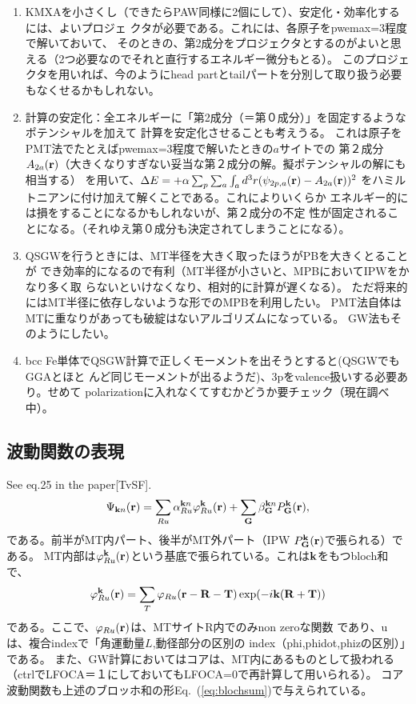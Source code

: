 \documentclass[a4paper,10pt,aip,onecolumn,amsmath,amssymb,floatfix,rmp]{revtex4-1}
\newcommand{\bfk}{{\bf k}}
\newcommand{\bfr}{{\bf r}}
\newcommand{\bfT}{{\bf T}}
\newcommand{\bfR}{{\bf R}}
\def\Psikn{\Psi_{{\bf k}n}}
\newcommand{\req}[1]{\mbox{Eq.~\!(\ref{#1})}}
\def\Psikn{{\Psi_{{\bf k}n}}}
\begin{document}
\begin{enumerate}
\item
KMXAを小さくし（できたらPAW同様に2個にして）、安定化・効率化するには、よいプロジェ
クタが必要である。これには、各原子をpwemax=3程度で解いておいて、
そのときの、第2成分をプロジェクタとするのがよいと思える（2つ必要なのでそれと直行するエネルギー微分もとる）。
このプロジェクタを用いれば、今のようにhead partとtailパートを分別して取り扱う必要もなくせるかもしれない。

\item
計算の安定化：全エネルギーに「第2成分（＝第０成分）」を固定するようなポテンシャルを加えて
計算を安定化させることも考えうる。
これは原子をPMT法でたとえばpwemax=3程度で解いたときの$a$サイトでの
第２成分$A_{2a}(\bfr)$（大きくなりすぎない妥当な第２成分の解。擬ポテンシャルの解にも相当する）
を用いて、$\Delta E= + \alpha \sum_p \sum_a \int_{a} d^3r (\psi_{2p,a}(\bfr) -A_{2a}(\bfr))^2$
をハミルトニアンに付け加えて解くことである。これによりいくらか
エネルギー的には損をすることになるかもしれないが、第２成分の不定
性が固定されることになる。（それゆえ第０成分も決定されてしまうことになる）。

\item 
QSGWを行うときには、MT半径を大きく取ったほうがPBを大きくとることが
でき効率的になるので有利（MT半径が小さいと、MPBにおいてIPWをかなり多く取
らないといけなくなり、相対的に計算が遅くなる）。
ただ将来的にはMT半径に依存しないような形でのMPBを利用したい。
PMT法自体はMTに重なりがあっても破綻はないアルゴリズムになっている。
GW法もそのようにしたい。
\item
bcc Fe単体でQSGW計算で正しくモーメントを出そうとすると(QSGWでもGGAとほと
んど同じモーメントが出るようだ)、3pをvalence扱いする必要あり。せめて
polarizationに入れなくてすむかどうか要チェック（現在調べ中）。
\end{enumerate}


\subsection{波動関数の表現}
See eq.25 in the paper[TvSF].
\begin{eqnarray}
\Psikn(\bfr)
= \sum_{Ru}\alpha^{{\bfk}n}_{Ru} \varphi^{\bf k}_{Ru}({\bfr})
 + \sum_{\bf G}  \beta^{{\bfk}n}_{\bf G} P^{\bf k}_{\bf G}({\bf r}),
\label{def:psiexp}
\end{eqnarray}
である。前半がMT内パート、後半がMT外パート（IPW $P^{\bf k}_{\bf G}({\bf r})$で張られる）である。
MT内部は$\varphi^{\bf k}_{Ru}({\bfr})$という基底で張られている。これは$\bfk$をもつbloch和で、
\begin{eqnarray}
\varphi^{\bfk}_{R u}(\bfr)=
\sum_T \varphi_{Ru}(\bfr-\bfR-\bfT)\exp(-i \bfk(\bfR+\bfT))
\label{eq:blochsum}
\end{eqnarray}
である。ここで、$\varphi_{Ru}(\bfr)$は、MTサイトR内でのみnon zeroな関数
であり、uは、複合indexで「角運動量$L$,動径部分の区別の
index（phi,phidot,phizの区別）」である。
また、GW計算においてはコアは、MT内にあるものとして扱われる（ctrlでLFOCA＝１にしておいてもLFOCA=0で再計算して用いられる）。
コア波動関数も上述のブロッホ和の形\req{eq:blochsum}で与えられている。
\end{document}

